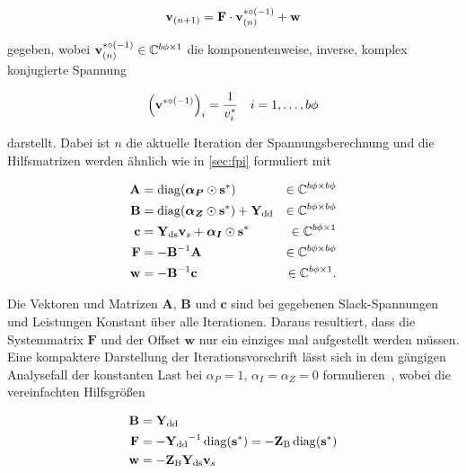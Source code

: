 \begin{equation}
	\mathbf{v}_{(n+1)} = \mathbf{F} \cdot \mathbf{v}_{(n)}^{*{\circ(-1)}} + \mathbf{w}
	\label{eq:tpf_iteration}
\end{equation}

gegeben, wobei $\mathbf{v}_{(n)}^{*{\circ(-1)}} \in \mathbb{C}^{b\phi \times 1}$ die komponentenweise, inverse, komplex konjugierte Spannung 


\begin{equation}
	\left(\mathbf{v}^{*{\circ(-1)}}\right)_i = \frac{1}{v_i^*} \quad  i = 1, \ldots, b\phi
	\label{eq:eleminv_def}
\end{equation}

darstellt.
Dabei ist $n$ die aktuelle Iteration der Spannungsberechnung und die Hilfsmatrizen werden ähnlich wie in \cref{sec:fpi} formuliert mit


\begin{align}
	\mathbf{A} &= \operatorname{diag}(\boldsymbol{\alpha_P} \odot \mathbf{s}^*)  &\in \mathbb{C}^{b\phi \times b\phi}\label{eq:tpf_A} \\
	\mathbf{B} &= \operatorname{diag}(\boldsymbol{\alpha_Z} \odot \mathbf{s}^*) + \mathbf{\mathbf{Y}_{\mathrm{dd}}} &\in \mathbb{C}^{b\phi \times b\phi} \label{eq:tpf_B}\\
	\mathbf{c} &= \mathbf{Y}_{\mathrm{ds}} \mathbf{v}_s + \boldsymbol{\alpha_I} \odot \mathbf{s}^* &\in \mathbb{C}^{b\phi \times 1} \label{eq:tpf_c}\\
	\mathbf{F} &= -\mathbf{B}^{-1}\mathbf{A} &\in \mathbb{C}^{b\phi \times b\phi} \label{eq:tpf_F}\\
	\mathbf{w} &= -\mathbf{B}^{-1}\mathbf{c} &\in \mathbb{C}^{b\phi \times 1}\label{eq:tpf_w}.
\end{align}

Die Vektoren und Matrizen $\mathbf{A}$, $\mathbf{B}$ und $\mathbf{c}$ sind bei gegebenen Slack-Spannungen und Leistungen Konstant über alle Iterationen. 
Daraus resultiert, dass die Systemmatrix $\mathbf{F}$ und der Offset $\mathbf{w}$ nur ein einziges mal aufgestellt werden müssen.\\


Eine kompaktere Darstellung der Iterationsvorschrift lässt sich in dem gängigen Analysefall der konstanten Last bei $\alpha_P = 1$, $\alpha_I = \alpha_Z = 0$ formulieren~\cite{Kundur1994,Kersting2017,IEEETF1995,VanCutsem1998,Bolognani2016}, wobei die vereinfachten Hilfsgrößen

\begin{align}
	\mathbf{B} &= {\mathbf{Y}_{\mathrm{dd}}} \label{eq:tpf_B_konstP}\\
	\mathbf{F} &= -{\mathbf{Y}_{\mathrm{dd}}}^{-1} \operatorname{diag}(\mathbf{s}^*) = -{\mathbf{Z}_\mathrm{B}} \operatorname{diag}(\mathbf{s}^*) \label{eq:tpf_F_konstP}\\
	\mathbf{w} &= -{\mathbf{Z}_\mathrm{B}} \mathbf{Y}_{\mathrm{ds}} \mathbf{v}_s \label{eq:tpf_w_konstP}
\end{align}


